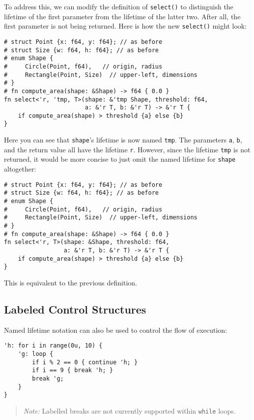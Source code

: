\documentclass[]{article}
\begin{document}
To address this, we can modify the definition of \texttt{select()} to
distinguish the lifetime of the first parameter from the lifetime of the
latter two. After all, the first parameter is not being returned. Here
is how the new \texttt{select()} might look:

\begin{verbatim}
# struct Point {x: f64, y: f64}; // as before
# struct Size {w: f64, h: f64}; // as before
# enum Shape {
#     Circle(Point, f64),   // origin, radius
#     Rectangle(Point, Size)  // upper-left, dimensions
# }
# fn compute_area(shape: &Shape) -> f64 { 0.0 }
fn select<'r, 'tmp, T>(shape: &'tmp Shape, threshold: f64,
                       a: &'r T, b: &'r T) -> &'r T {
    if compute_area(shape) > threshold {a} else {b}
}
\end{verbatim}

Here you can see that \texttt{shape}'s lifetime is now named
\texttt{tmp}. The parameters \texttt{a}, \texttt{b}, and the return
value all have the lifetime \texttt{r}. However, since the lifetime
\texttt{tmp} is not returned, it would be more concise to just omit the
named lifetime for \texttt{shape} altogether:

\begin{verbatim}
# struct Point {x: f64, y: f64}; // as before
# struct Size {w: f64, h: f64}; // as before
# enum Shape {
#     Circle(Point, f64),   // origin, radius
#     Rectangle(Point, Size)  // upper-left, dimensions
# }
# fn compute_area(shape: &Shape) -> f64 { 0.0 }
fn select<'r, T>(shape: &Shape, threshold: f64,
                 a: &'r T, b: &'r T) -> &'r T {
    if compute_area(shape) > threshold {a} else {b}
}
\end{verbatim}

This is equivalent to the previous definition.

\subsection{Labeled Control
Structures}\label{labeled-control-structures}

Named lifetime notation can also be used to control the flow of
execution:

\begin{verbatim}
'h: for i in range(0u, 10) {
    'g: loop {
        if i % 2 == 0 { continue 'h; }
        if i == 9 { break 'h; }
        break 'g;
    }
}
\end{verbatim}

\begin{quote}
\emph{Note:} Labelled breaks are not currently supported within
\texttt{while} loops.
\end{quote}
\end{document}

